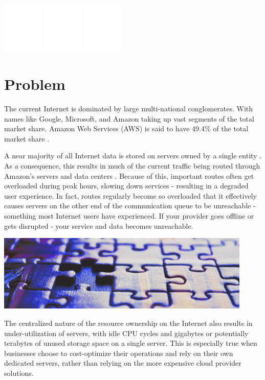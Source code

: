 \documentclass{article}
\begin{document}
\newpage
\begin{center}
\includegraphics[width=55pt]{centralized}
\hspace{1.5cm}
\includegraphics[width=55pt]{unreliable}
\hspace{1.5cm}
\includegraphics[width=55pt]{unsecure}
\end{center}
\section{Problem}
The current Internet is dominated by large multi-national conglomerates. With names like Google, Microsoft, and Amazon taking up vast segments of the total market share. Amazon Web Services (AWS) is said to have 49.4\% of the total market share \cite{jeb2019}.

A near majority of all Internet data is stored on servers owned by a single entity \cite{jeb2019}. As a consequence, this results in much of the current traffic being routed through Amazon’s servers and data centers \cite{jeb2019}. Because of this, important routes often get overloaded during peak hours, slowing down services - resulting in a degraded user experience. In fact, routes regularly become so overloaded that it effectively causes servers on the other end of the communication queue to be unreachable - something most Internet users have experienced. If your provider goes offline or gets disrupted - your service and data becomes unreachable.
\begin{mdframed}[style=textimage]
	\includegraphics[width=345pt]{puzzle}
\end{mdframed}
\noindent
The centralized nature of the resource ownership on the Internet also results in under-utilization of servers, with idle CPU cycles and gigabytes or potentially terabytes of unused storage space on a single server. This is especially true when businesses choose to cost-optimize their operations and rely on their own dedicated servers, rather than relying on the more expensive cloud provider solutions.
\end{document}

